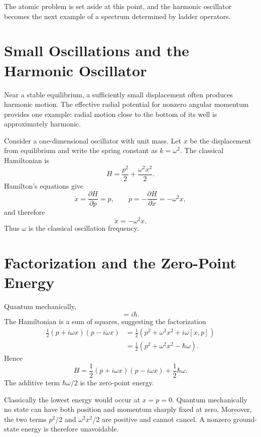 The atomic problem is set aside at this point, and the harmonic oscillator becomes the next example of a spectrum determined by ladder operators.

\section{Small Oscillations and the Harmonic Oscillator}

Near a stable equilibrium, a sufficiently small displacement often produces harmonic motion. The effective radial potential for nonzero angular momentum provides one example: radial motion close to the bottom of its well is approximately harmonic.

Consider a one-dimensional oscillator with unit mass. Let \(x\) be the displacement from equilibrium and write the spring constant as \(k=\omega^2\). The classical Hamiltonian is
\begin{equation}
H=\frac{p^2}{2}+\frac{\omega^2x^2}{2}.
\end{equation}
Hamilton's equations give
\begin{equation}
\dot{x}=\frac{\partial H}{\partial p}=p,
\qquad
\dot{p}=-\frac{\partial H}{\partial x}=-\omega^2x,
\end{equation}
and therefore
\begin{equation}
\ddot{x}=-\omega^2x.
\end{equation}
Thus \(\omega\) is the classical oscillation frequency.

\section{Factorization and the Zero-Point Energy}

Quantum mechanically,
\begin{equation}
[x,p]=i\hbar.
\end{equation}
The Hamiltonian is a sum of squares, suggesting the factorization
\begin{align}
\frac{1}{2}(p+i\omega x)(p-i\omega x)
&=\frac{1}{2}\left(p^2+\omega^2x^2+i\omega[x,p]\right) \\
&=\frac{1}{2}\left(p^2+\omega^2x^2-\hbar\omega\right).
\end{align}
Hence
\begin{equation}
H=\frac{1}{2}(p+i\omega x)(p-i\omega x)
+\frac{1}{2}\hbar\omega.
\end{equation}
The additive term \(\hbar\omega/2\) is the zero-point energy.

Classically the lowest energy would occur at \(x=p=0\). Quantum mechanically no state can have both position and momentum sharply fixed at zero. Moreover, the two terms \(p^2/2\) and \(\omega^2x^2/2\) are positive and cannot cancel. A nonzero ground-state energy is therefore unavoidable.

